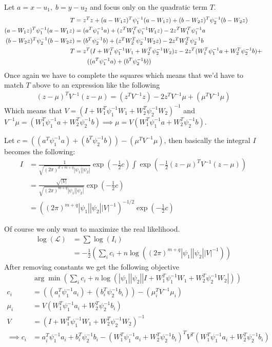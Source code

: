 \documentclass[11pt]{article}
\renewcommand{\det}[1]{|#1|}
\newcommand{\mf}{-\frac{1}{2}}
\begin{document}
Let $a = x-u_1, \; b = y-u_2$ and focus only on the quadratic term $T$.
\begin{align}
  T &= z^Tz + (a-W_1z)^T\psi_1^{-1}(a-W_1z) +
  (b-W_2z)^T\psi_2^{-1}(b-W_2z)\\
  (a-W_1z)^T\psi_1^{-1}(a-W_1z) &= (a^T\psi_1^{-1}a)+  (z^TW_1^T\psi_1^{-1}W_1z) - 2z^TW_1^T\psi_1^{-1}a\\
  (b-W_2z)^T\psi_2^{-1}(b-W_2z) &= (b^T\psi_2^{-1}b)+  (z^TW_2^T\psi_2^{-1}W_2z) - 2z^TW_2^T\psi_2^{-1}b\\
  T &= z^T(I+W_1^T\psi_1^{-1}W_1+W_2^T\psi_2^{-1}W_2)z -2z^T(W_1^T\psi_1^{-1}a + W_2^T\psi_2^{-1}b) + \notag\\
  & \qquad ((a^T\psi_1^{-1}a) + (b^T\psi_2^{-1}b))
\end{align}
Once again we have to complete the squares which means that we'd have to match $T$ above to an expression like the following
\begin{align}
  (z-\mu)^T V^{-1}(z-\mu)=  (z^T V^{-1}z) -2z^TV^{-1}\mu + (\mu^T V^{-1}\mu)
\end{align}
Which means that $V = (I+W_1^T\psi_1^{-1}W_1+W_2^T\psi_2^{-1}W_2)^{-1}$ and $V^{-1}\mu = (W_1^T\psi_1^{-1}a + W_2^T\psi_2^{-1}b) \implies \mu = V(W_1^T\psi_1^{-1}a + W_2^T\psi_2^{-1}b)$.

Let $c = ((a^T\psi_1^{-1}a) + (b^T\psi_2^{-1}b)) - (\mu^T V^{-1}\mu)$, then basically the integral $I$ becomes the following:
\begin{align}
  I &= \frac{1}{\sqrt{(2\pi)^{d+m+q} \det{\psi_1}\det{\psi_2} }}
  \exp(\mf c) \int \exp(\mf (z-\mu)^T V^{-1}(z-\mu))\\
  &= \frac{\sqrt{\det{V}}}{\sqrt{(2\pi)^{m+q} \det{\psi_1}\det{\psi_2} }} \exp(\mf c)\\
  &= ((2\pi)^{m+q}
  \det{\psi_1}\det{\psi_2}\det{V}^{-1})^{-1/2}\exp(\mf c) \label{ccasimple}
\end{align}

Of course we only want to maximize the real likelihood.
\begin{align}
  \log(\mathcal{L})&= \sum \log(I_i) \\
  &= \mf (\sum_i c_i + n \log((2\pi)^{m+q} \det{\psi_1}\det{\psi_2}\det{V}^{-1}))
\end{align}
After removing constants we get the following objective
\begin{align}
  & \arg\min (\sum_i c_i + n \log(\det{\psi_1}\det{\psi_2}\det{I+W_1^T\psi_1^{-1}W_1+W_2^T\psi_2^{-1}W_2}))\\
  c_i &= ((a_i^T\psi_1^{-1}a_i) + (b_i^T\psi_2^{-1}b_i)) - (\mu_i^T V^{-1}\mu_i)\\
  \mu_i &= V(W_1^T\psi_1^{-1}a_i + W_2^T\psi_2^{-1}b_i)\\
  V &= (I+W_1^T\psi_1^{-1}W_1+W_2^T\psi_2^{-1}W_2)^{-1}\\
  \implies c_i &= a_i^T\psi_1^{-1}a_i + b_i^T\psi_2^{-1}b_i - (W_1^T\psi_1^{-1}a_i + W_2^T\psi_2^{-1}b_i)^T V^T(W_1^T\psi_1^{-1}a_i + W_2^T\psi_2^{-1}b_i)
\end{align}
\end{document}
